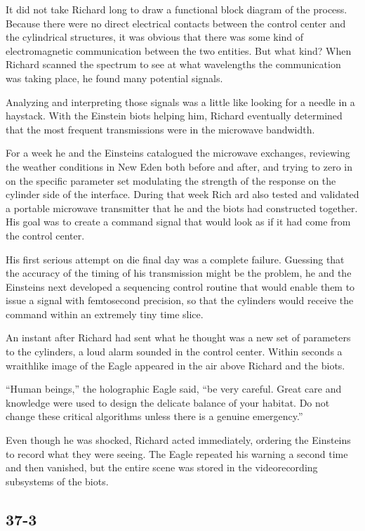 \documentclass[]{article}
\begin{document}
{It did not take Richard long to draw a functional block diagram of the process.  Because there were no direct electrical contacts between the control center and the cylindrical structures, it was obvious that there was some kind of electromagnetic communication between the two entities.  But what kind? When Richard scanned the spectrum to see at what wavelengths the communication was taking place, he found many potential signals.

Analyzing and interpreting those signals was a little like looking for a needle in a haystack.  With the Einstein biots helping him, Richard eventually determined that the most frequent transmissions were in the microwave bandwidth.

For a week he and the Einsteins catalogued the microwave exchanges, reviewing the weather conditions in New Eden both before and after, and trying to zero in on the specific parameter set modulating the strength of the response on the cylinder side of the interface.  During that week Rich ard also tested and validated a portable microwave transmitter that he and the biots had constructed together.  His goal was to create a command signal that would look as if it had come from the control center.

His first serious attempt on die final day was a complete failure.  Guessing that the accuracy of the timing of his transmission might be the problem, he and the Einsteins next developed a sequencing control routine that would enable them to issue a signal with femtosecond precision, so that the cylinders would receive the command within an extremely tiny time slice.

An instant after Richard had sent what he thought was a new set of parameters to the cylinders, a loud alarm sounded in the control center.  Within seconds a wraithlike image of the Eagle appeared in the air above Richard and the biots.

“Human beings,” the holographic Eagle said, “be very careful.  Great care and knowledge were used to design the delicate balance of your habitat.  Do not change these critical algorithms unless there is a genuine emergency.”

Even though he was shocked, Richard acted immediately, ordering the Einsteins to record what they were seeing.  The Eagle repeated his warning a second time and then vanished, but the entire scene was stored in the videorecording subsystems of the biots.


\subsection*{37-3}

}
\end{document}
